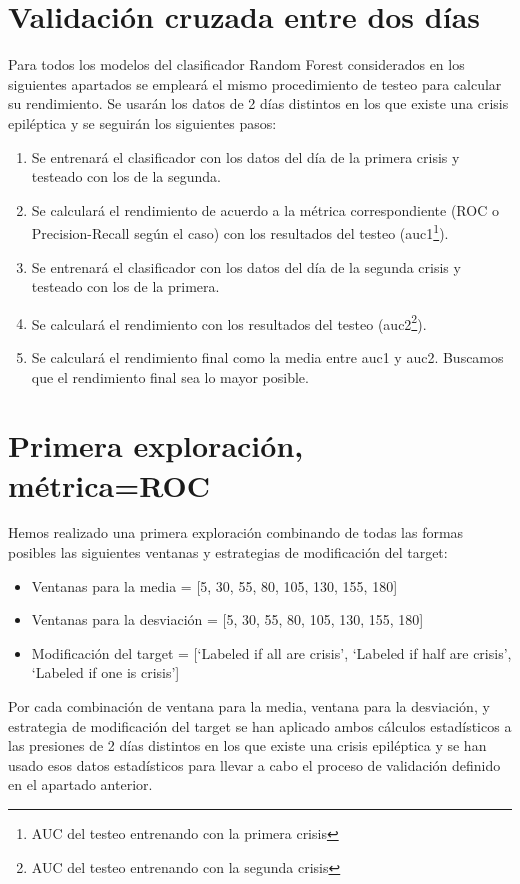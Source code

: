 \documentclass[a4paper,12pt,twoside,oldfontcommands]{memoir}
\begin{document}
\section{Validación cruzada entre dos días}\label{rf1}

Para todos los modelos del clasificador Random Forest considerados en los siguientes apartados se empleará el mismo procedimiento de testeo para calcular su rendimiento. Se usarán los datos de 2 días distintos en los que existe una crisis epiléptica y se seguirán los siguientes pasos: 

\begin{enumerate}
    \item Se entrenará el clasificador con los datos del día de la primera crisis y testeado con los de la segunda. 
    \item Se calculará el rendimiento de acuerdo a la métrica correspondiente (ROC o Precision-Recall según el caso) con los resultados del testeo (auc1\footnote{AUC del testeo entrenando con la primera crisis}). 
    \item Se entrenará el clasificador con los datos del día de la segunda crisis y testeado con los de la primera. 
    \item Se calculará el rendimiento con los resultados del testeo (auc2\footnote{AUC del testeo entrenando con la segunda crisis}). 
    \item Se calculará el rendimiento final como la media entre auc1 y auc2. Buscamos que el rendimiento final sea lo mayor posible. 
\end{enumerate}

\section{Primera exploración, métrica=ROC}

Hemos realizado una primera exploración combinando de todas las formas posibles las siguientes ventanas y estrategias de modificación del target: 
\begin{itemize}
    \item Ventanas para la media = [5, 30, 55, 80, 105, 130, 155, 180]
    \item Ventanas para la desviación = [5, 30, 55, 80, 105, 130, 155, 180]
    \item Modificación del target = [`Labeled if all are crisis', `Labeled if half are crisis', `Labeled if one is crisis']
\end{itemize}
 
Por cada combinación de ventana para la media, ventana para la desviación, y estrategia de modificación del target se han aplicado ambos cálculos estadísticos a las presiones de 2 días distintos en los que existe una crisis epiléptica y se han usado esos datos estadísticos para llevar a cabo el proceso de validación definido en el apartado anterior.
\end{document}
